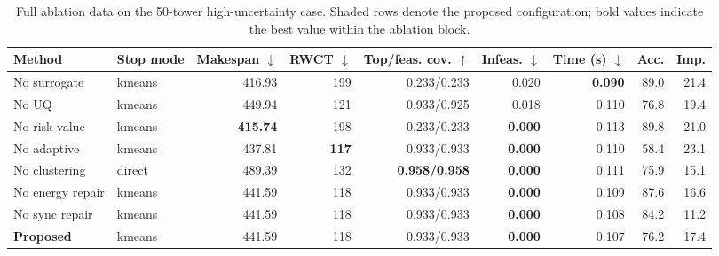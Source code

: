 ﻿\begin{table}[H]
\centering
\caption{Full ablation data on the 50-tower high-uncertainty case. Shaded rows denote the proposed configuration; bold values indicate the best value within the ablation block.}
\label{tab:ablation-results}
\small
\setlength{\tabcolsep}{2.7pt}
\begin{tabular}{@{}llrrrrrrr@{}}
\toprule
Method & Stop mode & Makespan $\downarrow$ & RWCT $\downarrow$ & Top/feas. cov. $\uparrow$ & Infeas. $\downarrow$ & Time (s) $\downarrow$ & Acc. & Imp. \\
\midrule
No surrogate & kmeans & 416.93 & 199 & 0.233/0.233 & 0.020 & \textbf{0.090} & 89.0 & 21.4 \\
No UQ & kmeans & 449.94 & 121 & 0.933/0.925 & 0.018 & 0.110 & 76.8 & 19.4 \\
No risk-value & kmeans & \textbf{415.74} & 198 & 0.233/0.233 & \textbf{0.000} & 0.113 & 89.8 & 21.0 \\
No adaptive & kmeans & 437.81 & \textbf{117} & 0.933/0.933 & \textbf{0.000} & 0.110 & 58.4 & 23.1 \\
No clustering & direct & 489.39 & 132 & \textbf{0.958/0.958} & \textbf{0.000} & 0.111 & 75.9 & 15.1 \\
No energy repair & kmeans & 441.59 & 118 & 0.933/0.933 & \textbf{0.000} & 0.109 & 87.6 & 16.6 \\
No sync repair & kmeans & 441.59 & 118 & 0.933/0.933 & \textbf{0.000} & 0.108 & 84.2 & 11.2 \\
\rowcolor{gray!10}
\textbf{Proposed} & kmeans & 441.59 & 118 & 0.933/0.933 & \textbf{0.000} & 0.107 & 76.2 & 17.4 \\
\bottomrule
\end{tabular}
\end{table}
